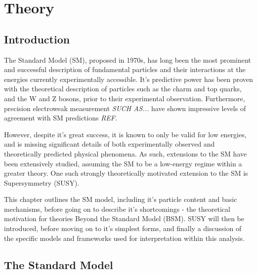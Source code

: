 
\chapter{Theory}
\label{ch:2}

\ifpdf
    \graphicspath{{Chapter2/Figs/Raster/}{Chapter2/Figs/PDF/}{Chapter2/Figs/}}
\else
    \graphicspath{{Chapter2/Figs/Vector/}{Chapter2/Figs/}}
\fi


\section{Introduction}  %
\label{sec:theory_intro}

The Standard Model (SM), proposed in 1970s, has long been the most prominent and 
successful description of fundamental particles and their interactions at the
energies currently experimentally accessible. It's predictive power has been proven with the 
theoretical description of particles such as the charm and top quarks, and the W and
Z bosons, prior to their experimental observation. Furthermore, precision 
electroweak measurement \emph{SUCH AS...} have shown impressive levels of 
agreement with SM predictions \emph{REF}.

However, despite it's great success, it is known to only be valid for low 
energies, and is missing significant details of both experimentally 
observed and theoretically predicted physical phenomena. As such, extensions to
the SM have been extensively studied, assuming the SM to be a low-energy 
regime within a greater theory. One such strongly theoretically motivated extension 
to the SM is Supersymmetry (SUSY).

This chapter outlines the SM model, including it's particle content and basic 
mechanisms, before going on to describe it's shortcomings - the theoretical 
motivation for theories Beyond the Standard Model (BSM). SUSY will then be 
introduced, before moving on to it's simplest forms, and finally a discussion of
the specific models and frameworks used for interpretation within this analysis.

\section{The Standard Model}
\label{sec:theory_current}

